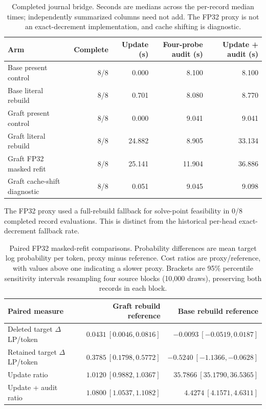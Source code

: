 \begin{table}[t]
\centering\small
\caption{Completed journal bridge. Seconds are medians across the per-record median times; independently summarized columns need not add. The FP32 proxy is not an exact-decrement implementation, and cache shifting is diagnostic.}
\label{tab:journal-bridge-cost}
\begin{tabular}{lrrrr}
\toprule
Arm & Complete & Update (s) & Four-probe audit (s) & Update + audit (s) \\
\midrule
Base present control & 8/8 & 0.000 & 8.100 & 8.100 \\
Base literal rebuild & 8/8 & 0.701 & 8.080 & 8.770 \\
Graft present control & 8/8 & 0.000 & 9.041 & 9.041 \\
Graft literal rebuild & 8/8 & 24.882 & 8.905 & 33.134 \\
Graft FP32 masked refit & 8/8 & 25.141 & 11.904 & 36.886 \\
Graft cache-shift diagnostic & 8/8 & 0.051 & 9.045 & 9.098 \\
\bottomrule
\end{tabular}
\end{table}

The FP32 proxy used a full-rebuild fallback for solve-point feasibility in 0/8 completed record evaluations. This is distinct from the historical per-head exact-decrement fallback rate.

\begin{table}[t]
\centering\small
\caption{Paired FP32 masked-refit comparisons. Probability differences are mean target log probability per token, proxy minus reference. Cost ratios are proxy/reference, with values above one indicating a slower proxy. Brackets are 95\% percentile sensitivity intervals resampling four source blocks (10{,}000 draws), preserving both records in each block.}
\label{tab:journal-bridge-paired}
\begin{tabular}{lrr}
\toprule
Paired measure & Graft rebuild reference & Base rebuild reference \\
\midrule
Deleted target $\Delta$ LP/token & $0.0431\ [0.0046, 0.0816]$ & $-0.0093\ [-0.0519, 0.0187]$ \\
Retained target $\Delta$ LP/token & $0.3785\ [0.1798, 0.5772]$ & $-0.5240\ [-1.1366, -0.0628]$ \\
Update ratio & $1.0120\ [0.9882, 1.0367]$ & $35.7866\ [35.1790, 36.5365]$ \\
Update + audit ratio & $1.0800\ [1.0537, 1.1082]$ & $4.4274\ [4.1571, 4.6311]$ \\
\bottomrule
\end{tabular}
\end{table}

